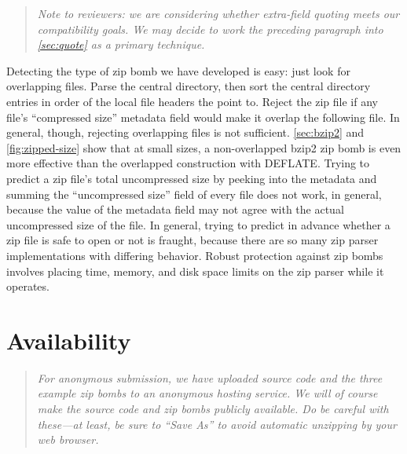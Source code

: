 \documentclass[letterpaper,twocolumn,10pt]{article}
\begin{document}
\begin{quote}
\sl
Note to reviewers:
we are considering whether extra-field quoting meets
our compatibility goals.
We may decide to work the preceding paragraph
into \autoref{sec:quote} as a primary technique.
\end{quote}

Detecting the type of zip bomb we have developed is easy:
just look for overlapping files.
Parse the central directory,
then sort the central directory entries
in order of the local file headers the point to.
Reject the zip file if any file's ``compressed size''
metadata field would make it overlap the following file.
In general, though, rejecting overlapping files is not sufficient.
\autoref{sec:bzip2} and \autoref{fig:zipped-size}
show that at small sizes, a non-overlapped bzip2 zip bomb
is even more effective than
the overlapped construction with DEFLATE.
Trying to predict a zip file's total uncompressed size
by peeking into the metadata and summing
the ``uncompressed size'' field of every file
does not work, in general,
because the value of the metadata field
may not agree with the actual uncompressed size of the file.
In general, trying to predict in advance whether a zip file
is safe to open or not is fraught,
because there are so many zip parser implementations
with differing behavior.
Robust protection against zip bombs
involves placing time, memory, and disk space limits
on the zip parser while it operates.




\section*{Availability}

\begin{quote}
\sl
For anonymous submission,
we have uploaded source code
and the three example zip bombs
to an anonymous hosting service.
We will of course make the source code
and zip bombs publicly available.
Do be careful with these---at least,
be sure to ``Save As''
to avoid automatic unzipping by your web browser.
\end{quote}
\end{document}
